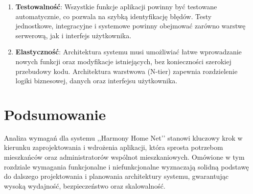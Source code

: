 \begin{enumerate}[label=\arabic*.]
	\item \textbf{Testowalność}: Wszystkie funkcje aplikacji powinny być testowane automatycznie, co pozwala na szybką identyfikację błędów. Testy jednostkowe, integracyjne i systemowe powinny obejmować zarówno warstwę serwerową, jak i interfejs użytkownika.

	\item \textbf{Elastyczność}: Architektura systemu musi umożliwiać łatwe wprowadzanie nowych funkcji oraz modyfikacje istniejących, bez konieczności szerokiej przebudowy kodu. Architektura warstwowa (N-tier) zapewnia rozdzielenie logiki biznesowej, danych oraz interfejsu użytkownika.

\end{enumerate}

\section{Podsumowanie}

Analiza wymagań dla systemu ,,Harmony Home Net’’ stanowi kluczowy krok w kierunku zaprojektowania i wdrożenia aplikacji, która sprosta potrzebom mieszkańców oraz administratorów wspólnot mieszkaniowych. Omówione w tym rozdziale wymagania funkcjonalne i niefunkcjonalne wyznaczają solidną podstawę do dalszego projektowania i planowania architektury systemu, gwarantując wysoką wydajność, bezpieczeństwo oraz skalowalność.

